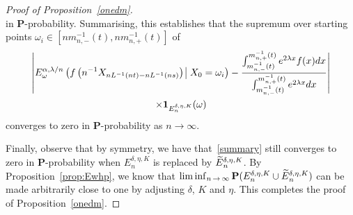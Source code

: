 \documentclass[AHL,Unicode,longabstracts,published]{cedram}
\newcommand{\bfP}{\mathbf{P}}
\newcommand{\bfun}{\mathbf{1}}
\let\oldtilde\tilde
\renewcommand*{\tilde}[1]{\mathchoice{\widetilde{#1}}{\widetilde{#1}}{\oldtilde{#1}}{\oldtilde{#1}}}
\begin{document}
\begin{proof}[Proof of Proposition~\ref{onedm}]
\[\]
in $\bfP$-probability. Summarising, this establishes that the supremum over starting points $\omega_i\in [nm_{n,-}^{-1}(t),nm_{n,+}^{-1}(t)]$ of
\begin{multline}\label{summary}
\left|{E}^{\alpha,\lambda/n}_\omega\left(f\left(n^{-1}{X}_{nL^{-1}(nt)-nL^{-1}(ns)}\right)\:\vline\:X_0=\omega_i\right)-\frac{\int_{m_{n,-}^{-1}(t)}^{m_{n,+}^{-1}(t)}e^{2\lambda x}f(x)dx}{\int_{m_{n,-}^{-1}(t)}^{m_{n,+}^{-1}(t)}e^{2\lambda x}dx}\right|\\
\times\bfun_{E_n^{\delta,\eta,K}}(\omega)
\end{multline}
converges to zero in $\bfP$-probability as $n\to\infty$.

Finally, observe that by symmetry, we have that~\eqref{summary} still converges to zero in $\bfP$-probability when ${E}_n^{\delta,\eta,K}$ is replaced by $\tilde{E}_n^{\delta,\eta,K}$. By Proposition~\ref{prop:Ewhp}, we know that $\liminf_{n\,\rightarrow\,\infty} \bfP({E}_n^{\delta,\eta,K}\cup \tilde{E}_n^{\delta,\eta,K})$ can be made arbitrarily close to one by adjusting $\delta$, $K$ and $\eta$. This completes the proof of Proposition~\ref{onedm}.
\end{proof}
\end{document}
